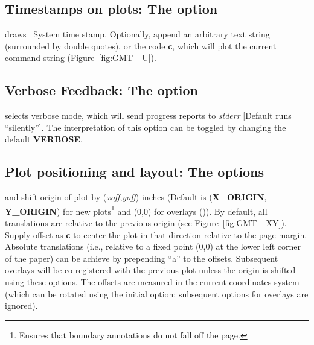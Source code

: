 \subsection{Timestamps on plots: The  option} 

 draws \UNIX\ System time stamp.  Optionally, append an arbitrary
text string (surrounded by double quotes), or the code \textbf{c}, which will
plot the current command string (Figure~\ref{fig:GMT_-U}).


\subsection{Verbose Feedback: The  option} 
\label{sec:verbose}
 selects verbose mode, which will send progress reports to
\emph{stderr} [Default runs ``silently''].  The interpretation of
this option can be toggled by changing the default \textbf{VERBOSE}.

\subsection{Plot positioning and layout: The   options}

 and  shift origin of plot by (\emph{xoff},\emph{yoff})
inches (Default is (\textbf{X\_ORIGIN}, \textbf{Y\_ORIGIN}) for new plots\footnote{Ensures that
boundary annotations do not fall off the page.} and (0,0) for overlays ()).
By default, all translations are relative to the previous origin
(see Figure~\ref{fig:GMT_-XY}).  Supply offset as \textbf{c} to center the
plot in that direction relative to the page margin.
Absolute translations (i.e., relative to a fixed point (0,0) at the
lower left corner of the paper) can be achieve by prepending ``a''
to the offsets.  Subsequent overlays will be co-registered with the
previous plot unless the origin is shifted using these options.
The offsets are measured in the current coordinates system (which can
be rotated using the initial  option; subsequent  options
for overlays are ignored).


